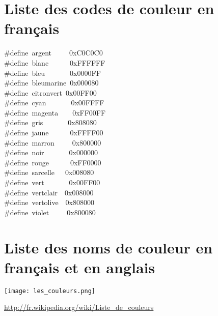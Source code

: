 \documentclass{report}
\newcommand\code[1]{
\begin{mdframed}[linecolor=purple,backgroundcolor=blue!10]
{\tt
#1
}
\end{mdframed}
}
\begin{document}
\section{Liste des codes de couleur en français}
\code{
\#define~argent~~~~~0xC0C0C0\\
\#define~blanc~~~~~~0xFFFFFF\\
\#define~bleu~~~~~~~0x0000FF\\
\#define~bleumarine~0x000080\\
\#define~citronvert~0x00FF00\\
\#define~cyan~~~~~~~0x00FFFF\\
\#define~magenta~~~~0xFF00FF\\
\#define~gris~~~~~~~0x808080\\
\#define~jaune~~~~~~0xFFFF00\\
\#define~marron~~~~~0x800000\\
\#define~noir~~~~~~~0x000000\\
\#define~rouge~~~~~~0xFF0000\\
\#define~sarcelle~~~0x008080\\
\#define~vert~~~~~~~0x00FF00\\
\#define~vertclair~~0x008000\\
\#define~vertolive~~0x808000\\
\#define~violet~~~~~0x800080
}

\section{Liste des noms de couleur en français et en anglais}
\texttt{[image: les\_couleurs.png]}

\url{http://fr.wikipedia.org/wiki/Liste_de_couleurs}
\end{document}
